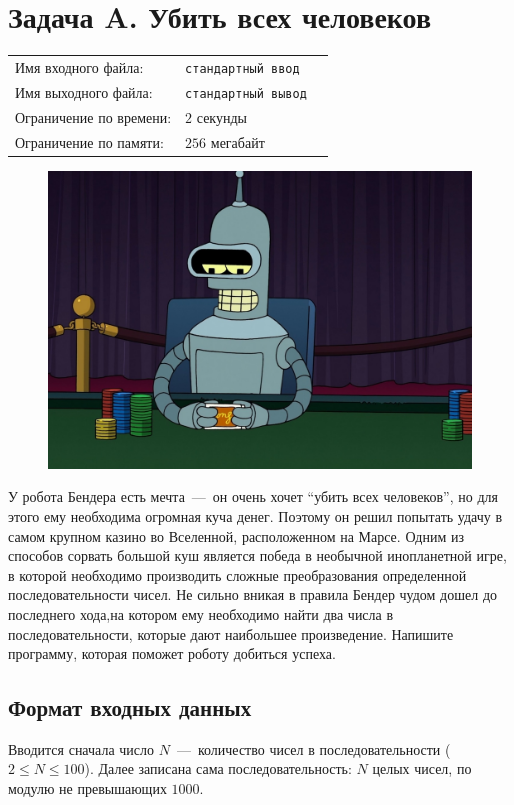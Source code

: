\documentclass[12pt]{scrartcl}
\newcommand{\inputFile}{стандартный ввод}
\newcommand{\outputFile}{стандартный вывод}
\begin{document}
\singlespacing

\section*{Задача A. Убить всех человеков }

\begin{tabularx}{\textwidth}{l l X}
    Имя входного файла: & \texttt{\inputFile} \\
    Имя выходного файла: & \texttt{\outputFile} \\
    Ограничение по времени: & $2$ секунды \\
    Ограничение по памяти: & $256$ мегабайт \\
\end{tabularx}

\begin{figure}[h]
	\centering
    \includegraphics[width=0.6\linewidth]{Bander}
\end{figure}

У робота Бендера есть мечта~---~он очень хочет ``убить всех человеков'', но для этого ему необходима огромная куча денег. Поэтому он решил попытать удачу в самом крупном казино во Вселенной, расположенном на Марсе. Одним из способов сорвать большой куш является победа в необычной инопланетной игре, в которой необходимо производить сложные преобразования определенной последовательности чисел. Не сильно вникая в правила Бендер чудом дошел до последнего хода,на котором ему необходимо найти два числа в последовательности, которые дают наибольшее произведение. Напишите программу, которая поможет роботу добиться успеха. 

\subsection*{Формат входных данных}
Вводится сначала число $N$~---~количество чисел в последовательности ($2 \leq N \leq 100$). Далее записана сама последовательность: $N$ целых чисел, по модулю не превышающих $1000$.
\end{document}
